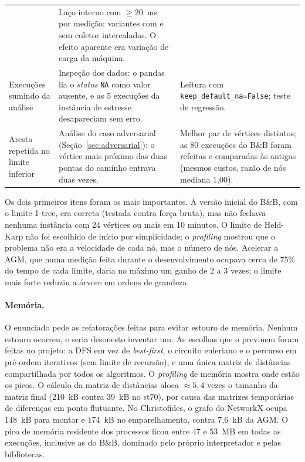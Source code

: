 \begin{table}[htb]
\begin{tabularx}{\textwidth}{>{\raggedright\arraybackslash}p{3.3cm}
                             >{\raggedright\arraybackslash}X
                             >{\raggedright\arraybackslash}X}
  & Laço interno com $\geq 20$~ms por medição; variantes com e sem coletor intercaladas.
    O efeito aparente era variação de carga da máquina. \\
Execuções sumindo da análise
  & Inspeção dos dados: o pandas lia o \emph{status} \texttt{NA} como valor ausente, e as
    5 execuções da instância de estresse desapareciam sem erro.
  & Leitura com \texttt{keep\_default\_na=False}; teste de regressão. \\
Aresta repetida no limite inferior
  & Análise do caso adversarial (Seção~\ref{sec:adversarial}): o vértice mais próximo das
    duas pontas do caminho entrava duas vezes.
  & Melhor par de vértices distintos; as 80 execuções do B\&B foram refeitas e comparadas
    às antigas (mesmos custos, razão de nós mediana 1,00). \\
\bottomrule
\end{tabularx}
\end{table}

Os dois primeiros itens foram os mais importantes. A versão inicial do B\&B, com o limite
1-tree, era correta (testada contra força bruta), mas não fechava nenhuma instância com 24
vértices ou mais em 10 minutos. O limite de Held-Karp não foi escolhido de início por simplicidade; o
\emph{profiling} mostrou que o problema não era a velocidade de cada nó, mas o número de
nós. Acelerar a AGM, que numa medição feita durante o desenvolvimento ocupava cerca de 75\%
do tempo de cada limite, daria no máximo um ganho de 2 a 3 vezes; o limite mais forte reduziu a árvore em ordens de grandeza.

\paragraph{Memória.} O enunciado pede as refatorações feitas para evitar estouro de
memória. Nenhum estouro ocorreu, e seria desonesto inventar um. As escolhas que o
previnem foram feitas no projeto: a DFS em vez de \emph{best-first}, o circuito euleriano
e o percurso em pré-ordem iterativos (sem limite de recursão), e uma única matriz de
distâncias compartilhada por todos os algoritmos. O \emph{profiling} de memória mostra
onde estão os picos. O cálculo da matriz de distâncias aloca $\approx 5{,}4$ vezes o
tamanho da matriz final (210~kB contra 39~kB no st70), por causa das matrizes temporárias
de diferenças em ponto flutuante. No Christofides, o grafo do NetworkX ocupa 148~kB para
montar e 174~kB no emparelhamento, contra 7,6~kB da AGM. O pico de memória residente dos processos
ficou entre 47 e 53~MB em todas as execuções, inclusive as do B\&B, dominado pelo próprio
interpretador e pelas bibliotecas.

